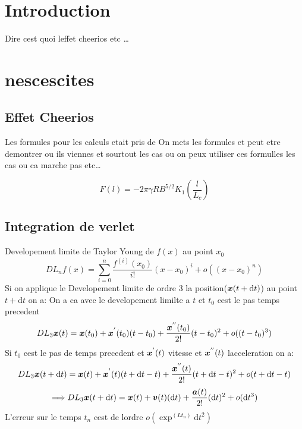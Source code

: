 \documentclass[a4paper, 11pt, oneside]{article} %
\newcommand{\dd}[1]{\mathrm{d}#1}
\begin{document}
 

\newpage
\section*{Introduction}
    Dire cest quoi leffet cheerios etc \ldots

    \section{nescescites}
    \subsection{Effet Cheerios}
    Les formules pour les calculs etait pris de \cite{cheerios_2005} 
    On mets les formules et peut etre demontrer ou ils viennes et sourtout les cas ou on peux utiliser ces formulles les cas ou ca marche pas etc\ldots

    \begin{equation}
        \label{ForceEntreCheerios}
        F(l) = -2\pi \gamma R B^{5/2} K_1 \left( \frac{l}{L_c}\right)
    \end{equation}
    \subsection{Integration de verlet}
    Developement limite de Taylor Young de $f(x)$ au point $x_0$%
    \begin{equation}
        DL_n f(x) = \sum_{i=0}^{n}\frac{f^{(i)}(x_0)}{i!}(x-x_0)^i+ o((x-x_0)^n)
    \end{equation}
    Si on applique le Developement limite de ordre 3 la position($\vb*{x}(t+\dd t)$) au point $t+\dd t$ on a:
    On a ca avec le developement limilte a $t$ et $t_0$ cest le pas temps precedent
    \[DL_3 \vb*{x}(t) = \vb*{x}(t_0)+\vb*{x}^{'}(t_0)(t-t_0)+\frac{\vb*{x}^{''}(t_0)}{2!}(t-t_0)^2 +o((t-t_0)^3)\]
    Si $t_0$ cest le pas de temps precedent et $\vb*{x}^{'}(t)$ vitesse et $\vb*{x}^{''}(t)$ lacceleration on a:
        \[DL_3 \vb*{x}(t+\dd t) = \vb*{x}(t)+\vb*{x}^{'}(t)(t+\dd t-t)+\frac{\vb*{x}^{''}(t)}{2!}(t+\dd t-t)^2+o(t+\dd t-t)\]
        \[\Longrightarrow DL_3 \vb*{x}(t+\dd t)= \vb*{x}(t)+\vb*{v}(t)(\dd t)+\frac{\vb*{a}(t)}{2!}(\dd t)^2+o(\dd t^3)\]
    L'erreur sur le temps $t_n$ cest de lordre $o(\exp^(Lt_n)\dd t^2)$ %
    
\end{document}
